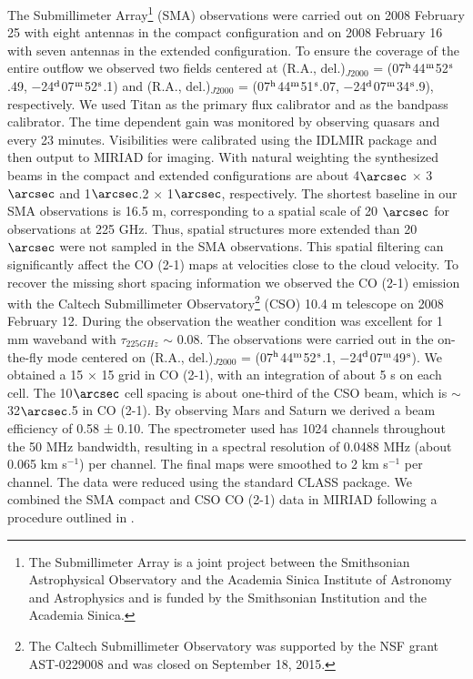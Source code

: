 The Submillimeter Array\footnote{    The Submillimeter Array is a joint project between the Smithsonian Astrophysical Observatory and the Academia Sinica Institute of Astronomy and Astrophysics and is funded by the Smithsonian Institution and the Academia Sinica.} (SMA) observations were carried out on 2008 February 25 with eight antennas in the compact configuration and on 2008 February 16 with seven antennas in the extended configuration. To ensure the coverage of the entire outflow we observed two fields centered at (R.A., del.)$_{J2000}$ = (07$^\textup{h}$44$^\textup{m}$52$^\textup{s}$.49, −24$^\textup{d}$07$^\textup{m}$52$^\textup{s}$.1) and (R.A., del.)$_{J2000}$ = (07$^\textup{h}$44$^\textup{m}$51$^\textup{s}$.07, −24$^\textup{d}$07$^\textup{m}$34$^\textup{s}$.9), respectively. We used Titan as the primary flux calibrator and  as the bandpass calibrator. The time dependent gain was monitored
by observing quasars  and  every 23 minutes. Visibilities were calibrated using the IDLMIR package and then output to MIRIAD for imaging. With natural weighting the synthesized beams in the compact and extended configurations are about 4${\arcsec}$ $\times$ 3${\arcsec}$ and 1${\arcsec}$.2 $\times$ 1${\arcsec}$, respectively. The shortest baseline in our SMA observations is 16.5 m, corresponding to a spatial scale of 20 ${\arcsec}$ for observations at 225 GHz. Thus, spatial structures more extended than 20 ${\arcsec}$ were not sampled in the SMA observations. This spatial filtering can significantly affect the CO (2-1) maps at velocities close to the cloud velocity. To recover the missing short spacing information we observed the CO (2-1) emission with the Caltech
Submillimeter Observatory\footnote{    The Caltech Submillimeter Observatory was supported by the NSF grant
AST-0229008 and was closed on September 18, 2015.} (CSO) 10.4 m telescope on 2008 February 12. During the observation the weather condition was excellent for 1 mm waveband with $\tau_{225GHz}$ $\sim$ 0.08. The observations were carried out in the on-the-fly mode centered on (R.A., del.)$_{J2000}$ = (07$^\textup{h}$44$^\textup{m}$52$^\textup{s}$.1, −24$^\textup{d}$07$^\textup{m}$49$^\textup{s}$). We obtained a 15 × 15 grid in CO (2-1), with an integration of about 5 s on each cell. The 10${\arcsec}$ cell spacing is about one-third of the CSO beam, which is $\sim$ 32${\arcsec}$.5 in CO (2-1). By observing Mars and Saturn we derived a beam efficiency of 0.58 ± 0.10. The spectrometer used has 1024 channels throughout the 50 MHz bandwidth, resulting in a spectral resolution of 0.0488 MHz (about 0.065 km s$^{-1}$) per channel. The final maps were smoothed to 2 km s$^{-1}$ per channel. The data were reduced using the standard CLASS package. We combined the SMA compact and CSO CO (2-1) data in MIRIAD following a procedure outlined in \citet{1995ApJ...451L..71Z}. 